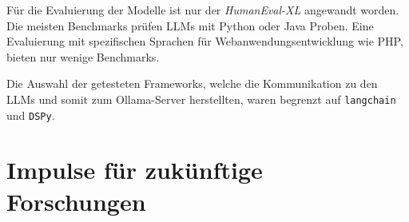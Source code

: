 Für die Evaluierung der Modelle ist nur der \textit{HumanEval-XL} angewandt worden. Die meisten Benchmarks prüfen LLMs mit Python oder Java Proben. Eine Evaluierung mit spezifischen Sprachen für Webanwendungsentwicklung wie PHP, bieten nur wenige Benchmarks.\vspace{0.2cm}

Die Auswahl der getesteten Frameworks, welche die Kommunikation zu den LLMs und somit zum Ollama-Server herstellten, waren begrenzt auf \texttt{langchain} und \texttt{DSPy}.\vspace{0.2cm}

\section{Impulse für zukünftige Forschungen}

